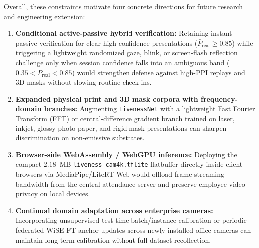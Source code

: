 Overall, these constraints motivate four concrete directions for future research and engineering extension:
\begin{enumerate}
    \item \textbf{Conditional active-passive hybrid verification:} Retaining instant passive verification for clear high-confidence presentations ($\bar{P}_{\text{real}} \ge 0.85$) while triggering a lightweight randomized gaze, blink, or screen-flash reflection challenge only when session confidence falls into an ambiguous band ($0.35 < \bar{P}_{\text{real}} < 0.85$) would strengthen defense against high-PPI replays and 3D masks without slowing routine check-ins.
    \item \textbf{Expanded physical print and 3D mask corpora with frequency-domain branches:} Augmenting \texttt{LivenessNet} with a lightweight Fast Fourier Transform (FFT) or central-difference gradient branch trained on laser, inkjet, glossy photo-paper, and rigid mask presentations can sharpen discrimination on non-emissive substrates.
    \item \textbf{Browser-side WebAssembly / WebGPU inference:} Deploying the compact $2.18$~MB \texttt{liveness\_cam4k.tflite} flatbuffer directly inside client browsers via MediaPipe/LiteRT-Web would offload frame streaming bandwidth from the central attendance server and preserve employee video privacy on local devices.
    \item \textbf{Continual domain adaptation across enterprise cameras:} Incorporating unsupervised test-time batch/instance calibration or periodic federated WiSE-FT anchor updates across newly installed office cameras can maintain long-term calibration without full dataset recollection.
\end{enumerate}
